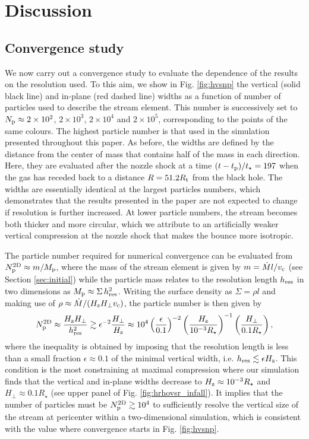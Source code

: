 \documentclass[a4paper,fleqn,usenatbib]{mnras}
\newcommand{\be}{\begin{equation}}
\newcommand{\ee}{\end{equation}}
\newcommand{\rstar}{R_{\star}}
\newcommand{\rt}{R_{\rm t}}
\newcommand{\tp}{t_{\rm p}}
\newcommand{\tstar}{t_{\star}}
\begin{document}
\section{Discussion}
\label{sec:discussion}

\subsection{Convergence study}
\label{sec:convergence}


We now carry out a convergence study to evaluate the dependence of the results on the resolution used. To this aim, we show in Fig. \ref{fig:hvsnp} the vertical (solid black line) and in-plane (red dashed line) widths as a function of number of particles used to describe the stream element. This number is successively set to $N_{\rm p} \approx 2 \times 10^2$, $2 \times 10^3$, $2 \times 10^4$ and $2 \times 10^5$, corresponding to the points of the same colours. The highest particle number is that used in the simulation presented throughout this paper. As before, the widths are defined by the distance from the center of mass that contains half of the mass in each direction. Here, they are evaluated after the nozzle shock at a time $(t - \tp)/\tstar = 197$ when the gas has receded back to a distance $R = 51.2 \rt$ from the black hole. The widths are essentially identical at the largest particles numbers, which demonstrates that the results presented in the paper are not expected to change if resolution is further increased. At lower particle numbers, the stream becomes both thicker and more circular, which we attribute to an artificially weaker vertical compression at the nozzle shock that makes the bounce more isotropic.


The particle number required for numerical convergence can be evaluated from $N^{\rm 2D}_{\rm p} \approx m/M_{\rm p}$, where the mass of the stream element is given by $m = \dot{M} l / v_{\rm c}$ (see Section \ref{sec:initial}) while the particle mass relates to the resolution length $h_{\rm res}$ in two dimensions as $M_{\rm p} \approx \Sigma \, h^2_{\rm res}$. Writing the surface density as $\Sigma = \rho l$ and making use of $\rho \approx \dot{M}/(H_{\rm z}H_{\perp} v_{\rm c})$, the particle number is then given by 
\be
N^{\rm 2D}_{\rm p} \approx  \frac{H_{\rm z}H_{\perp}}{h^2_{\rm res}} \gtrsim \epsilon^{-2} \frac{H_{\perp}}{H_{\rm z}} \approx 10^4 \left( \frac{\epsilon}{0.1} \right)^{-2} \left( \frac{H_{\rm z}}{10^{-3} \rstar} \right)^{-1} \left( \frac{H_{\perp}}{0.1 \rstar} \right),
\ee
where the inequality is obtained by imposing that the resolution length is less than a small fraction $\epsilon \approx 0.1$ of the minimal vertical width, i.e. $h_{\rm res} \lesssim \epsilon H_{\rm z}$. This condition is the most constraining at maximal compression where our simulation finds that the vertical and in-plane widths decrease to $H_{\rm z} \approx 10^{-3} \rstar$ and $H_{\perp} \approx 0.1 \rstar$ (see upper panel of Fig. \ref{fig:hrhovsr_infall}). It implies that the number of particles must be $N^{\rm 2D}_{\rm p} \gtrsim 10^4$ to sufficiently resolve the vertical size of the stream at pericenter within a two-dimensional simulation, which is consistent with the value where convergence starts in Fig. \ref{fig:hvsnp}.
\end{document}
